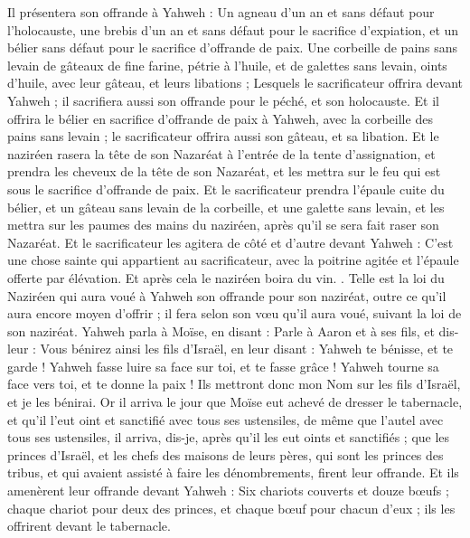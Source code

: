 \begin{multicols}{2}
Il présentera son offrande à Yahweh : Un agneau d'un an et sans défaut pour l'holocauste, une brebis d'un an et sans défaut pour le sacrifice d'expiation, et un bélier sans défaut pour le sacrifice d'offrande de paix.
Une corbeille de pains sans levain de gâteaux de fine farine, pétrie à l'huile, et de galettes sans levain, oints d'huile, avec leur gâteau, et leurs libations ;
Lesquels le sacrificateur offrira devant Yahweh ; il sacrifiera aussi son offrande pour le péché, et son holocauste.
Et il offrira le bélier en sacrifice d'offrande de paix à Yahweh, avec la corbeille des pains sans levain ; le sacrificateur offrira aussi son gâteau, et sa libation.
Et le naziréen rasera la tête de son Nazaréat à l'entrée de la tente d'assignation, et prendra les cheveux de la tête de son Nazaréat, et les mettra sur le feu qui est sous le sacrifice d'offrande de paix.
Et le sacrificateur prendra l'épaule cuite du bélier, et un gâteau sans levain de la corbeille, et une galette sans levain, et les mettra sur les paumes des mains du naziréen, après qu'il se sera fait raser son Nazaréat.
Et le sacrificateur les agitera de côté et d'autre devant Yahweh : C'est une chose sainte qui appartient au sacrificateur, avec la poitrine agitée et l'épaule offerte par élévation. Et après cela le naziréen boira du vin.
.
Telle est la loi du Naziréen qui aura voué à Yahweh son offrande pour son naziréat, outre ce qu'il aura encore moyen d'offrir ; il fera selon son vœu qu'il aura voué, suivant la loi de son naziréat.
Yahweh parla à Moïse, en disant :
Parle à Aaron et à ses fils, et dis-leur : Vous bénirez ainsi les fils d'Israël, en leur disant :
Yahweh te bénisse, et te garde !
Yahweh fasse luire sa face sur toi, et te fasse grâce !
Yahweh tourne sa face vers toi, et te donne la paix !
Ils mettront donc mon Nom sur les fils d'Israël, et je les bénirai.
\VerseOne{}Or il arriva le jour que Moïse eut achevé de dresser le tabernacle, et qu'il l'eut oint et sanctifié avec tous ses ustensiles, de même que l'autel avec tous ses ustensiles, il arriva, dis-je, après qu'il les eut oints et sanctifiés ;
que les princes d'Israël, et les chefs des maisons de leurs pères, qui sont les princes des tribus, et qui avaient assisté à faire les dénombrements, firent leur offrande.
Et ils amenèrent leur offrande devant Yahweh : Six chariots couverts et douze bœufs ; chaque chariot pour deux des princes, et chaque bœuf pour chacun d'eux ; ils les offrirent devant le tabernacle.

\end{multicols}
